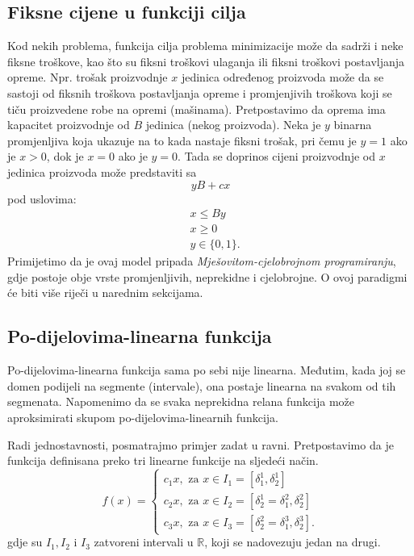 \documentclass[b5paper, utf8, 11pt, colorlinks]{book}
\theoremstyle{definition}
\begin{document}

\subsection{Fiksne cijene u funkciji cilja}

 Kod nekih problema, funkcija cilja problema minimizacije može da sadrži i neke fiksne troškove, kao što su fiksni troškovi ulaganja ili fiksni troškovi postavljanja opreme. Npr. trošak proizvodnje $x$ jedinica određenog proizvoda može da se sastoji od fiksnih troškova postavljanja opreme i promjenjivih troškova koji se tiču proizvedene robe na opremi (mašinama). Pretpostavimo da oprema ima kapacitet proizvodnje od $B$ jedinica (nekog proizvoda). Neka je $y$ binarna promjenljiva koja ukazuje na to kada nastaje fiksni trošak, pri čemu  je $y=1$ ako je $x >0$, dok je $x=0$ ako je $y=0$. Tada se doprinos cijeni proizvodnje od $x$ jedinica proizvoda može predstaviti sa
$$ yB + c x $$ pod uslovima:
\begin{align}
	&x \leq By \\
	& x \geq 0 \\
	& y \in \{0, 1\}.
\end{align}
Primijetimo da je ovaj model pripada \emph{Mješovitom-cjelobrojnom programiranju}, gdje postoje obje vrste promjenljivih, neprekidne i cjelobrojne. O ovoj paradigmi će biti više riječi u narednim sekcijama. 

\subsection{Po-dijelovima-linearna funkcija} 

 Po-dijelovima-linearna funkcija sama po sebi nije linearna. Međutim, kada joj se domen podijeli na segmente (intervale), ona postaje linearna na svakom od tih segmenata. Napomenimo da se svaka neprekidna relana funkcija može aproksimirati skupom po-dijelovima-linearnih funkcija.  

Radi jednostavnosti, posmatrajmo primjer zadat u ravni. Pretpostavimo da je funkcija definisana preko tri linearne funkcije na sljedeći način.
$$f(x) = \begin{cases}
	c_1 x, \mbox{ za } x \in I_1 = [\delta^1_1, \delta^1_2] \\
	c_2 x, \mbox{ za } x \in I_2 = [\delta^1_2 = \delta^2_1, \delta^2_2] \\
	c_3 x, \mbox{ za } x \in I_3 = [\delta^2_2 = \delta^3_1, \delta^3_2].
\end{cases}
$$
gdje su $I_1, I_2$ i $I_3$  zatvoreni intervali u $\mathbb{R}$, koji se nadovezuju jedan na drugi.
\end{document}
